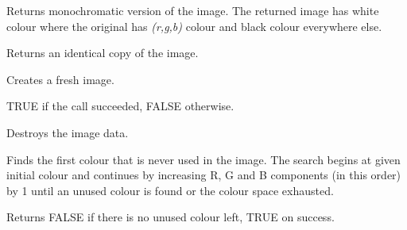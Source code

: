 
Returns monochromatic version of the image. The returned image has white
colour where the original has {\it (r,g,b)} colour and black colour 
everywhere else.

\label{wximagecopy}


Returns an identical copy of the image.

\label{wximagecreate}


Creates a fresh image.





TRUE if the call succeeded, FALSE otherwise.

\label{wximagedestroy}


Destroys the image data.

\label{wximagefindfirstunusedcolour}





Finds the first colour that is never used in the image. The search begins at
given initial colour and continues by increasing R, G and B components (in this
order) by 1 until an unused colour is found or the colour space exhausted.


Returns FALSE if there is no unused colour left, TRUE on success.

